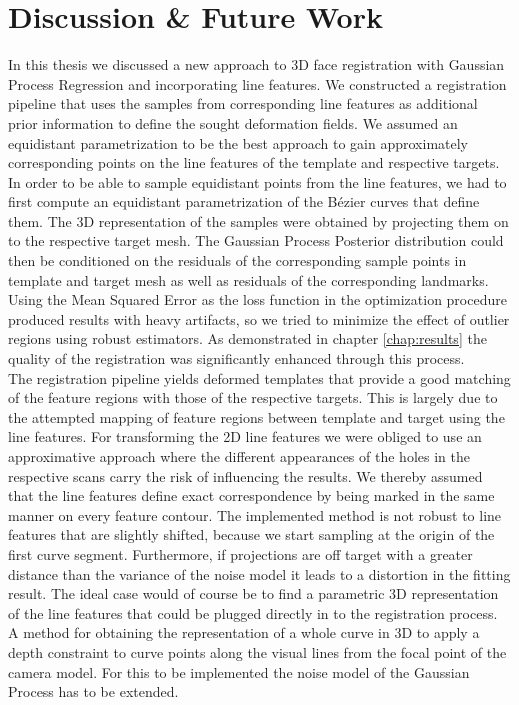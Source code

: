 \chapter{Discussion \& Future Work}
In this thesis we discussed a new approach to 3D face registration with Gaussian Process Regression and incorporating line features. We constructed a registration pipeline that uses the samples from corresponding line features as additional prior information to define the sought deformation fields. We assumed an equidistant parametrization to be the best approach to gain approximately corresponding points on the line features of the template and respective targets. In order to be able to sample equidistant
points from the line features, we had to first compute an equidistant parametrization of the B\'{e}zier curves that define them. The 3D representation of the samples were obtained by projecting them on to the respective target mesh. The Gaussian Process Posterior distribution could then be conditioned on the residuals of the corresponding sample points in template and target mesh as well as residuals of the  corresponding landmarks. Using the Mean Squared Error as the loss function in the optimization procedure produced results with heavy artifacts, so we tried to minimize the effect of outlier regions using robust estimators.
As demonstrated in chapter \ref{chap:results} the quality of the registration was significantly enhanced through this process.\\
The registration pipeline yields deformed templates that provide a good matching of the feature regions with those of the respective targets. This is largely due to the attempted mapping of feature regions between template and target using the line features. For
transforming the 2D line features we were obliged to use an approximative approach where the different appearances of the holes in the respective scans carry the risk of influencing the results. We thereby assumed that the line features define exact correspondence by being marked in the same manner on every feature contour. The implemented method is not robust to line features that are slightly shifted, because we start sampling at the origin of the first curve segment.
Furthermore, if projections are off target with a greater distance than the variance of the noise model it leads to a distortion in the fitting result.
The ideal case would of course be to find a parametric 3D representation of the line features that could be plugged directly in to the registration process. A method for obtaining the representation of a whole curve in 3D to apply a depth constraint to curve points along the visual lines from the focal point of the camera model. For this to be implemented the noise model of the Gaussian Process has to be extended.\\
